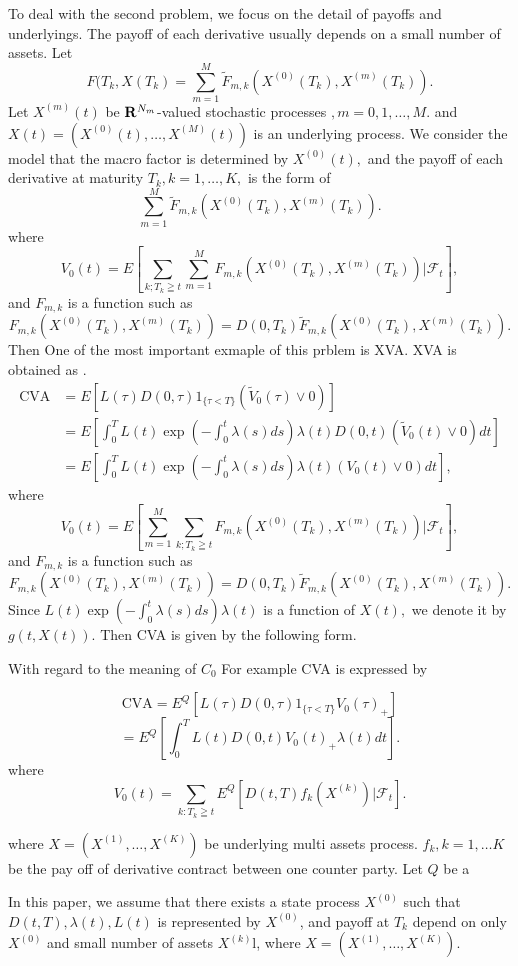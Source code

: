 \documentclass[12pt]{article}
\begin{document}
To deal with the second problem, we focus on the detail of payoffs and underlyings.
The payoff of each derivative usually depends on a small number of assets.
Let $$F(T_k, X(T_k) = \sum_{m=1}^M \tilde{F}_{m,k}(X^{(0)}(T_k), X^{(m)}(T_k)).$$
Let $X^{(m)}(t)$ be ${\bf R}^{N_m}$-valued
stochastic processes $, m=0, 1, \ldots, M.$ and $X(t)=(X^{(0)}(t),\ldots, X^{(M)}(t))$ is an underlying process. 
We consider the model that the macro factor is determined by $X^{(0)}(t),$ and the payoff of each derivative at maturity $T_k, k=1,\ldots,K,$ is the form of
$$\sum_{m=1}^M \tilde{F}_{m,k}(X^{(0)}(T_k), X^{(m)}(T_k)).$$
where
$$V_0(t) =E[ \sum_{k; T_k \geqq t}\sum_{m=1}^M F_{m,k}(X^{(0)}(T_k), X^{(m)}(T_k)) | \mathcal{F}_t],$$
and $F_{m,k}$ is a function such as 
$$F_{m,k}(X^{(0)}(T_k), X^{(m)}(T_k))=D(0,T_k)\tilde{F}_{m,k}(X^{(0)}(T_k), X^{(m)}(T_k)).$$
Then
One of the most important exmaple of this prblem is XVA.
XVA is obtained as .
\begin{align}
\text{CVA}&= E[L(\tau)D(0,\tau)1_{\{\tau <T\}}(\tilde{V}_0(\tau)\vee 0)] \nonumber\\
&=E[\int_0^T L(t)\exp(-\int_0^t \lambda(s)ds ) \lambda(t)D(0,t) (\tilde{V}_0(t) \vee 0)  dt ] \nonumber\\
&=E[\int_0^T L(t)\exp(-\int_0^t \lambda(s)ds ) \lambda(t) (V_0(t) \vee 0)  dt ] \label{defCVA},
\end{align}
where
$$V_0(t) =E[\sum_{m=1}^M \sum_{k; T_k \geqq t}F_{m,k}(X^{(0)}(T_k), X^{(m)}(T_k)) | \mathcal{F}_t],$$
and $F_{m,k}$ is a function such as 
$$F_{m,k}(X^{(0)}(T_k), X^{(m)}(T_k))=D(0,T_k)\tilde{F}_{m,k}(X^{(0)}(T_k), X^{(m)}(T_k)).$$
Since $L(t)\exp(-\int_0^t \lambda(s)ds ) \lambda(t)$ is a function of $X(t),$ we denote it by $g(t,X(t)).$ Then CVA is given by the following form. 



With regard to the meaning of $C_0$
For example CVA is expressed by 

$$\text{CVA}= E^Q[L(\tau)D(0,\tau)1_{\{\tau <T\}}V_0(\tau)_{+}]$$ $$=E^{Q}[\int_0^T L(t)D(0,t) V_0(t)_{+} \lambda(t) dt ]  .$$
where $$V_0(t) = \sum_{k:T_k\geqq t} E^{Q}[D(t,T) f_k(X^{(k)}) |\mathcal{F}_t].$$
 

 where $X=(X^{(1)}, \ldots, X^{(K)})$ be underlying multi assets process. $f_k, k=1,\ldots K$ be the pay off of derivative contract between one counter party. Let $Q$ be a 

 In this paper, we assume that there exists a state process $X^{(0)}$ such that $D(t,T), \lambda(t),
L(t)$ is represented by $X^{(0)}$, and payoff at $T_k$ depend on only $X^{(0)}$ and small number of 
assets $X^{(k)}$l, where $X=(X^{(1)}, \ldots, X^{(K)})$.
\end{document}

